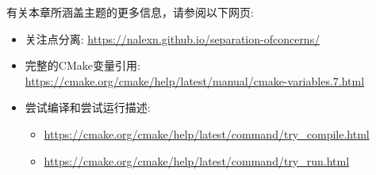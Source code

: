

有关本章所涵盖主题的更多信息，请参阅以下网页:

\begin{itemize}
\item 
关注点分离: \url{https://nalexn.github.io/separation-ofconcerns/}

\item 
完整的CMake变量引用: \url{https://cmake.org/cmake/help/latest/manual/cmake-variables.7.html}

\item 
尝试编译和尝试运行描述:
\begin{itemize}
\item 
\url{https://cmake.org/cmake/help/latest/command/try_compile.html}

\item 
\url{https://cmake.org/cmake/help/latest/command/try_run.html}
\end{itemize}
\end{itemize}
